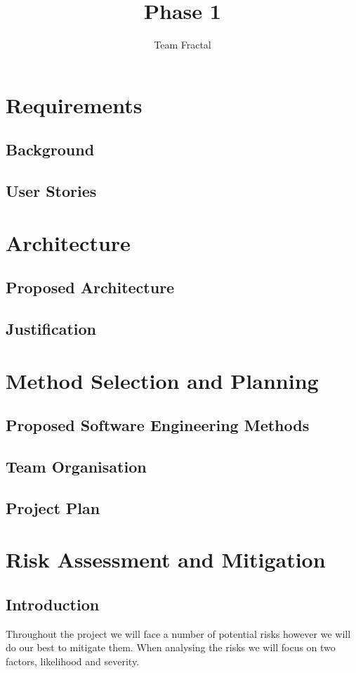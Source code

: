 \documentclass{report}   	%
\title{Phase 1}
\author{Team Fractal}
\date{}							%
\begin{document}
\maketitle

\chapter{Requirements}
\section{Background}

\section{User Stories}

\chapter{Architecture}
\section{Proposed Architecture}
\section{Justification}

\chapter{Method Selection and Planning}
\section{Proposed Software Engineering Methods}
\section{Team Organisation}
\section{Project Plan}

\chapter{Risk Assessment and Mitigation}
\section{Introduction}
Throughout the project we will face a number of potential risks however we will do our best to mitigate them.
When analysing the risks we will focus on two factors, likelihood and severity.
\end{document}

